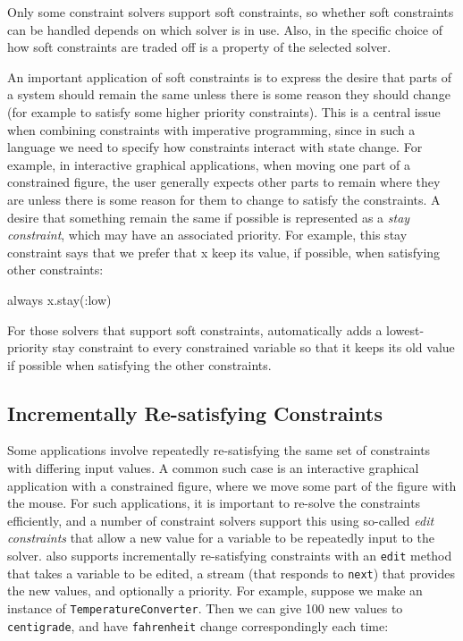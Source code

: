 Only some constraint solvers support soft constraints, so whether soft
constraints can be handled depends on which solver is in use.  Also,
in \langname the specific choice of how soft constraints are traded
off is a property of the selected solver.

An important application of soft constraints is to express the desire
that parts of a system should remain the same unless there is some
reason they should change (for example to satisfy some higher priority
constraints).  This is a central issue when combining constraints with
imperative programming, since in such a language we need to specify
how constraints interact with state change.  For example, in
interactive graphical applications, when moving one part of a
constrained figure, the user generally expects other parts to remain
where they are unless there is some reason for them to change to
satisfy the constraints.  A desire that something remain the same if
possible is represented as a \emph{stay constraint}, which may have an
associated priority.  For example, this stay constraint says that we
prefer that x keep its value, if possible, when satisfying other
constraints:

\begin{code}
always { x.stay(:low) }
\end{code}

For those solvers that support soft constraints, \langname
automatically adds a lowest-priority stay constraint to every constrained
variable so that it keeps its old value if possible when satisfying
the other constraints.

\subsection{Incrementally Re-satisfying Constraints}

Some applications involve repeatedly re-satisfying the same set of
constraints with differing input values.  A common such case is an
interactive graphical application with a constrained figure, where we
move some part of the figure with the mouse.  For such applications,
it is important to re-solve the constraints efficiently, and a number
of constraint solvers support this using so-called \emph{edit
  constraints} that allow a new value for a variable to be repeatedly
input to the solver.  \langname also supports incrementally
re-satisfying constraints with an \lstinline{edit} method that takes a
variable to be edited, a stream (that responds to \lstinline{next})
that provides the new values, and optionally a priority.  For example,
suppose we make an instance of \lstinline{TemperatureConverter}.  Then
we can give 100 new values to \lstinline{centigrade}, and have
\lstinline{fahrenheit} change correspondingly each time:

